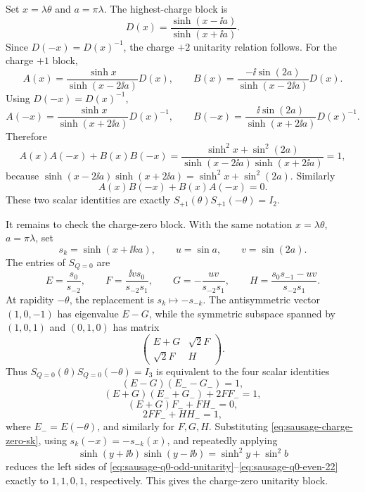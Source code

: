 Set \(x=\lambda\theta\) and \(a=\pi\lambda\).  The highest-charge block is
\[
  D(x)=\frac{\sinh(x-\ii a)}{\sinh(x+\ii a)}.
\]
Since \(D(-x)=D(x)^{-1}\), the charge \(+2\) unitarity relation follows.
For the charge \(+1\) block,
\[
  A(x)=\frac{\sinh x}{\sinh(x-2\ii a)}D(x),
  \qquad
  B(x)=\frac{-\ii\sin(2a)}{\sinh(x-2\ii a)}D(x).
\]
Using \(D(-x)=D(x)^{-1}\),
\[
  A(-x)=\frac{\sinh x}{\sinh(x+2\ii a)}D(x)^{-1},
  \qquad
  B(-x)=\frac{\ii\sin(2a)}{\sinh(x+2\ii a)}D(x)^{-1}.
\]
Therefore
\[
  A(x)A(-x)+B(x)B(-x)
  =
  \frac{\sinh^2x+\sin^2(2a)}
       {\sinh(x-2\ii a)\sinh(x+2\ii a)}
  =1,
\]
because
\(\sinh(x-2\ii a)\sinh(x+2\ii a)=\sinh^2x+\sin^2(2a)\).  Similarly
\[
  A(x)B(-x)+B(x)A(-x)=0.
\]
These two scalar identities are exactly
\(S_{+1}(\theta)S_{+1}(-\theta)=I_2\).

It remains to check the charge-zero block.  With the same notation
\(x=\lambda\theta\), \(a=\pi\lambda\), set
\[
  s_k=\sinh(x+\ii k a),\qquad u=\sin a,\qquad v=\sin(2a).
\]
The entries of \(S_{Q=0}\) are
\begin{equation}
  E=\frac{s_0}{s_{-2}},\qquad
  F=\frac{\ii v s_0}{s_{-2}s_1},\qquad
  G=-\frac{uv}{s_{-2}s_1},\qquad
  H=\frac{s_0s_{-1}-uv}{s_{-2}s_1}.
  \label{eq:sausage-charge-zero-sk}
\end{equation}
At rapidity \(-\theta\), the replacement is \(s_k\mapsto -s_{-k}\).  The
antisymmetric vector \((1,0,-1)\) has eigenvalue \(E-G\), while the symmetric
subspace spanned by \((1,0,1)\) and \((0,1,0)\) has matrix
\[
  \begin{pmatrix}
    E+G&\sqrt2 F\\
    \sqrt2 F&H
  \end{pmatrix}.
\]
Thus \(S_{Q=0}(\theta)S_{Q=0}(-\theta)=I_3\) is equivalent to the four scalar
identities
\begin{equation}
  (E-G)(E_- -G_-)=1,
  \label{eq:sausage-q0-odd-unitarity}
\end{equation}
\begin{equation}
  (E+G)(E_-+G_-)+2FF_-=1,
  \label{eq:sausage-q0-even-11}
\end{equation}
\begin{equation}
  (E+G)F_-+FH_-=0,
  \label{eq:sausage-q0-even-12}
\end{equation}
\begin{equation}
  2FF_-+HH_-=1,
  \label{eq:sausage-q0-even-22}
\end{equation}
where \(E_-=E(-\theta)\), and similarly for \(F,G,H\).  Substituting
\eqref{eq:sausage-charge-zero-sk}, using \(s_k(-x)=-s_{-k}(x)\), and
repeatedly applying
\[
  \sinh(y+\ii b)\sinh(y-\ii b)=\sinh^2y+\sin^2b
\]
reduces the left sides of
\eqref{eq:sausage-q0-odd-unitarity}--\eqref{eq:sausage-q0-even-22} exactly
to \(1,1,0,1\), respectively.  This gives the charge-zero unitarity block.

